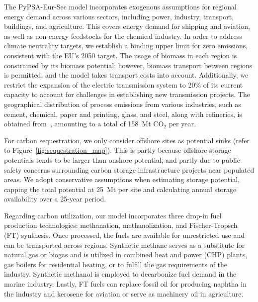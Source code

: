 \documentclass[conference]{IEEEtran}
\newcommand{\carbon}{CO$_2$}
\begin{document}
The PyPSA-Eur-Sec model incorporates exogenous assumptions for regional energy demand across various sectors, including power, industry, transport, buildings, and agriculture. This covers energy demand for shipping and aviation, as well as non-energy feedstocks for the chemical industry. In order to address climate neutrality targets, we establish a binding upper limit for zero emissions, consistent with the EU's 2050 target. The usage of biomass in each region is constrained by its biomass potential; however, biomass transport between regions is permitted, and the model takes transport costs into account. Additionally, we restrict the expansion of the electric transmission system to 20\% of its current capacity to account for challenges in establishing new transmission projects. The geographical distribution of process emissions from various industries, such as cement, chemical, paper and printing, glass, and steel, along with refineries, is obtained from~\cite{piamanzGeoreferencedIndustrialSites2018}, amounting to a total of 158~Mt \carbon{} per year.



For carbon sequestration, we only consider offshore sites as potential sinks (refer to Figure~\ref{fig:sequestration_map}). This is partly because offshore storage potentials tends to be larger than onshore potential, and partly due to public safety concerns surrounding carbon storage infrastructure projects near populated areas. We adopt conservative assumptions when estimating storage potential, capping the total potential at 25~Mt per site and calculating annual storage availability over a 25-year period.



Regarding carbon utilization, our model incorporates three drop-in fuel production technologies: methanation, methanolization, and Fischer-Tropsch (FT) synthesis. Once processed, the fuels are available for unrestricted use and can be transported across regions. Synthetic methane serves as a substitute for natural gas or biogas and is utilized in combined heat and power (CHP) plants, gas boilers for residential heating, or to fulfill the gas requirements of the industry. Synthetic methanol is employed to decarbonize fuel demand in the marine industry. Lastly, FT fuels can replace fossil oil for producing naphtha in the industry and kerosene for aviation or serve as machinery oil in agriculture.
\end{document}
